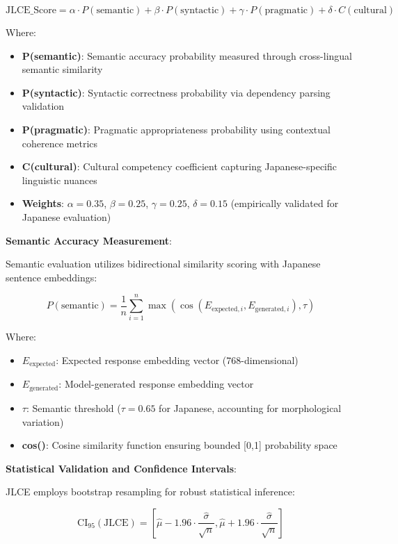 \documentclass[12pt,a4paper]{article}
\begin{document}
\begin{equation}
\text{JLCE\_Score} = \alpha \cdot P(\text{semantic}) + \beta \cdot P(\text{syntactic}) + \gamma \cdot P(\text{pragmatic}) + \delta \cdot C(\text{cultural})
\end{equation}

Where:
\begin{itemize}
\item \textbf{P(semantic)}: Semantic accuracy probability measured through cross-lingual semantic similarity
\item \textbf{P(syntactic)}: Syntactic correctness probability via dependency parsing validation
\item \textbf{P(pragmatic)}: Pragmatic appropriateness probability using contextual coherence metrics
\item \textbf{C(cultural)}: Cultural competency coefficient capturing Japanese-specific linguistic nuances
\item \textbf{Weights}: $\alpha=0.35$, $\beta=0.25$, $\gamma=0.25$, $\delta=0.15$ (empirically validated for Japanese evaluation)
\end{itemize}

\textbf{Semantic Accuracy Measurement}:

Semantic evaluation utilizes bidirectional similarity scoring with Japanese sentence embeddings:

\begin{equation}
P(\text{semantic}) = \frac{1}{n} \sum_{i=1}^{n} \max(\cos(E_{\text{expected},i}, E_{\text{generated},i}), \tau)
\end{equation}

Where:
\begin{itemize}
\item \textbf{$E_{\text{expected}}$}: Expected response embedding vector (768-dimensional)
\item \textbf{$E_{\text{generated}}$}: Model-generated response embedding vector
\item \textbf{$\tau$}: Semantic threshold ($\tau=0.65$ for Japanese, accounting for morphological variation)
\item \textbf{cos()}: Cosine similarity function ensuring bounded [0,1] probability space
\end{itemize}

\textbf{Statistical Validation and Confidence Intervals}:

JLCE employs bootstrap resampling for robust statistical inference:

\begin{equation}
\text{CI}_{95}(\text{JLCE}) = \left[\hat{\mu} - 1.96 \cdot \frac{\hat{\sigma}}{\sqrt{n}}, \hat{\mu} + 1.96 \cdot \frac{\hat{\sigma}}{\sqrt{n}}\right]
\end{equation}
\end{document}
